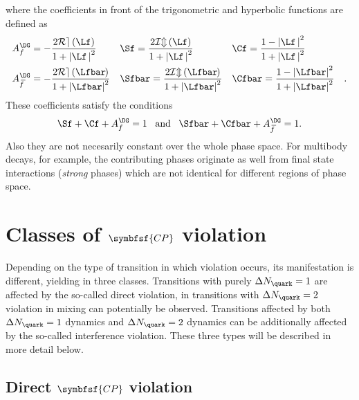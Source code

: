 where the coefficients in front of the trigonometric and hyperbolic functions are defined as
\begin{align}
&A_f^{\DG}=-\frac{2\mathcal{Re}\left(\Lf\right)}{1+\left|\Lf\,\right|^2}&
&\Sf=\frac{2\mathcal{Im}\left(\Lf\right)}{1+\left|\Lf\,\right|^2}&
&\Cf=\frac{1-\left|\Lf\,\right|^2}{1+\left|\Lf\,\right|^2}&\label{eq:cpcoeff}\\
&A_{\kern 1.5pt\overline{\kern -1.5pt f\kern 1.5pt}}^{\DG}=-\frac{2\mathcal{Re}\left(\Lfbar\kern -0.1em\right)}{1+\left|\Lfbar\right|^2}&
&\Sfbar=\frac{2\mathcal{Im}\left(\Lfbar\kern -0.1em\right)}{1+\left|\Lfbar\right|^2}&
&\Cfbar=\frac{1-\left|\Lfbar\right|^2}{1+\left|\Lfbar\right|^2}&\label{eq:cpcoeffbar}.
\end{align}
These coefficients satisfy the conditions
\begin{equation}
\Sf+\Cf+A_f^{\DG}=1\,\,\,\,\,\text{and}\,\,\,\,\,\Sfbar+\Cfbar+A_{\kern 1.5pt\overline{\kern -1.5pt f\kern 1.5pt}}^{\DG}=1.\label{eq:CpCoeffCond}
\end{equation}
Also they are not necesarily constant over the whole phase space.
For multibody decays, for example, the contributing phases originate as well from final state interactions (\ie \emph{strong} phases) which are not identical for different regions of phase space.

\section[head={Classes of \CP violation},tocentry={Classes of \CP violation}]{Classes of $\symbfsf{C{}P}$ violation}
\label{sec:CPVClasses}

Depending on the type of transition in which \CP violation occurs, its manifestation is different, yielding in three classes.
Transitions with purely $\Delta N_\quark=1$ are affected by the so-called direct \CP violation, in transitions with $\Delta N_\quark=2$ \CP violation in mixing can potentially be observed.
Transitions affected by both $\Delta N_\quark=1$ dynamics and $\Delta N_\quark=2$ dynamics can be additionally affected by the so-called interference \CP violation.
These three types will be described in more detail below.


\subsection[head={Direct \CP violation},tocentry={Direct \CP violation}]{Direct $\symbfsf{C{}P}$ violation}
\label{sec:DirectCPV}

